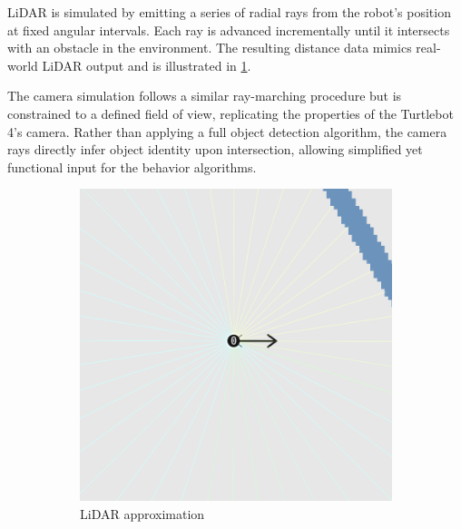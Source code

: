 LiDAR is simulated by emitting a series of radial rays from the robot's position at fixed angular intervals. Each ray is advanced incrementally until it intersects with an obstacle in the environment. The resulting distance data mimics real-world LiDAR output and is illustrated in \cref{fig:lidar-approximation}.

The camera simulation follows a similar ray-marching procedure but is constrained to a defined field of view, replicating the properties of the Turtlebot 4’s camera. Rather than applying a full object detection algorithm, the camera rays directly infer object identity upon intersection, allowing simplified yet functional input for the behavior algorithms.

\begin{figure}
    \centering
    \begin{subfigure}[b]{0.45\textwidth}
        \centering
        \includegraphics[width=\textwidth]{figures/screenshots/simple-lidar.png}
        \caption{LiDAR approximation}
        \label{fig:lidar-approximation}
    \end{subfigure}
    \hfill
    \begin{subfigure}[b]{0.45\textwidth}
        \centering

\end{subfigure}
\end{figure}
